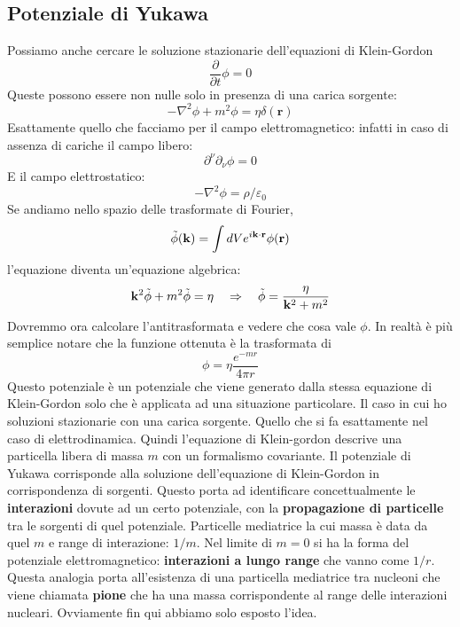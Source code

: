 \subsection{Potenziale di Yukawa}
Possiamo anche cercare le soluzione stazionarie dell'equazioni di Klein-Gordon
\begin{equation*}
    \frac{\partial }{\partial t}\phi=0
\end{equation*}
Queste possono essere non nulle solo in presenza di una carica sorgente:
\begin{equation*}
    -\nabla^2\phi+m^2\phi=\eta\delta(\mathbf{r})
\end{equation*}
Esattamente quello che facciamo per il campo elettromagnetico: infatti in caso di assenza di cariche il campo libero:
\begin{equation*}
    \partial^\nu\partial_\nu\phi=0
\end{equation*}
E il campo elettrostatico:
\begin{equation*}
    -\nabla^2\phi=\rho/\varepsilon_0
\end{equation*}
Se andiamo nello spazio delle trasformate di Fourier,
\begin{equation*}
    \Tilde{\phi}(\mathbf{k})=\int dVe^{i\mathbf{k}\cdot\mathbf{r}}\phi(\mathbf{r})
\end{equation*}
l'equazione diventa un'equazione algebrica:
\begin{equation*}
    \mathbf{k}^2\Tilde{\phi}+m^2\Tilde{\phi}=\eta \quad \Rightarrow\quad \Tilde{\phi}=\frac{\eta}{\mathbf{k}^2+m^2}
\end{equation*}
Dovremmo ora calcolare l'antitrasformata e vedere che cosa vale $\phi$. In realtà è più semplice notare che la funzione ottenuta è la trasformata di
\begin{equation*}
    \phi=\eta\frac{e^{-mr}}{4\pi r}
\end{equation*}
Questo potenziale è un potenziale che viene generato dalla stessa equazione di Klein-Gordon solo che è applicata ad una situazione particolare. Il caso in cui ho soluzioni stazionarie con una carica sorgente. Quello che si fa esattamente nel caso di elettrodinamica. Quindi l'equazione di Klein-gordon descrive una particella libera di massa $m$ con un formalismo covariante. Il potenziale di Yukawa corrisponde alla soluzione dell'equazione di Klein-Gordon in corrispondenza di sorgenti. Questo porta ad identificare concettualmente le \textbf{interazioni} dovute ad un certo potenziale, con la \textbf{propagazione di particelle} tra le sorgenti di quel potenziale. Particelle mediatrice la cui massa è data da quel $m$ e range di interazione: $1/m$. Nel limite di $m=0$ si ha la forma del potenziale elettromagnetico: \textbf{interazioni a lungo range} che vanno come $1/r$. Questa analogia porta all'esistenza di una particella mediatrice tra nucleoni che viene chiamata \textbf{pione} che ha una massa corrispondente al range delle interazioni nucleari. Ovviamente fin qui abbiamo solo esposto l'idea.
